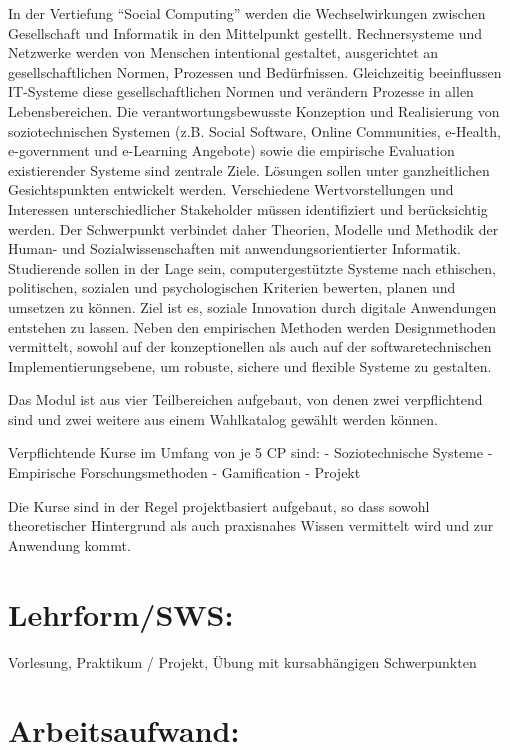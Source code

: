 In der Vertiefung ``Social Computing'' werden die Wechselwirkungen
zwischen Gesellschaft und Informatik in den Mittelpunkt gestellt.
Rechnersysteme und Netzwerke werden von Menschen intentional gestaltet,
ausgerichtet an gesellschaftlichen Normen, Prozessen und Bedürfnissen.
Gleichzeitig beeinflussen IT-Systeme diese gesellschaftlichen Normen und
verändern Prozesse in allen Lebensbereichen. Die verantwortungsbewusste
Konzeption und Realisierung von soziotechnischen Systemen (z.B. Social
Software, Online Communities, e-Health, e-government und e-Learning
Angebote) sowie die empirische Evaluation existierender Systeme sind
zentrale Ziele. Lösungen sollen unter ganzheitlichen Gesichtspunkten
entwickelt werden. Verschiedene Wertvorstellungen und Interessen
unterschiedlicher Stakeholder müssen identifiziert und berücksichtig
werden. Der Schwerpunkt verbindet daher Theorien, Modelle und Methodik
der Human- und Sozialwissenschaften mit anwendungsorientierter
Informatik. Studierende sollen in der Lage sein, computergestützte
Systeme nach ethischen, politischen, sozialen und psychologischen
Kriterien bewerten, planen und umsetzen zu können. Ziel ist es, soziale
Innovation durch digitale Anwendungen entstehen zu lassen. Neben den
empirischen Methoden werden Designmethoden vermittelt, sowohl auf der
konzeptionellen als auch auf der softwaretechnischen
Implementierungsebene, um robuste, sichere und flexible Systeme zu
gestalten.

Das Modul ist aus vier Teilbereichen aufgebaut, von denen zwei
verpflichtend sind und zwei weitere aus einem Wahlkatalog gewählt werden
können.

Verpflichtende Kurse im Umfang von je 5 CP sind: - Soziotechnische
Systeme - Empirische Forschungsmethoden - Gamification - Projekt

Die Kurse sind in der Regel projektbasiert aufgebaut, so dass sowohl
theoretischer Hintergrund als auch praxisnahes Wissen vermittelt wird
und zur Anwendung kommt.

\section{Lehrform/SWS:}\label{lehrformsws-26}

Vorlesung, Praktikum / Projekt, Übung mit kursabhängigen Schwerpunkten

\section{Arbeitsaufwand:}\label{arbeitsaufwand-26}

